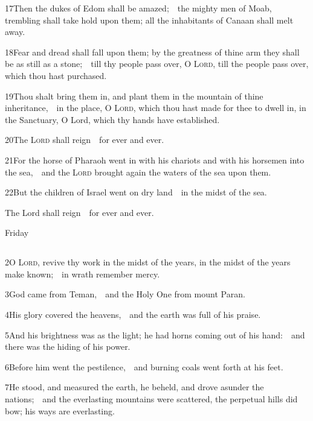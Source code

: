 17\enspace Then the dukes of Edom shall be amazed;\ \star\ the mighty men of Moab, trembling shall take hold upon them; all the inhabitants of Canaan shall melt away.

18\enspace Fear and dread shall fall upon them; by the greatness of thine arm they shall be as still as a stone;\ \star\ till thy people pass over, O {\scshape Lord}, till the people pass over, which thou hast purchased.

19\enspace Thou shalt bring them in, and plant them in the mountain of thine inheritance,\ \star\ in the place, O {\scshape Lord}, which thou hast made for thee to dwell in, in the Sanctuary, O Lord, which thy hands have established.

20\enspace The {\scshape Lord} shall reign\ \star\ for ever and ever.

21\enspace For the horse of Pharaoh went in with his chariots and with his horsemen into the sea,\ \star\ and the {\scshape Lord} brought again the waters of the sea upon them.

22\enspace But the children of Israel went on dry land\ \star\ in the midst of the sea.

 The Lord shall reign\ \star\ for ever and ever.

\medskip
\centerline{Friday}
\subsection{}

2\enspace O {\scshape Lord}, revive thy work in the midst of the years, in the midst of the years make known;\ \star\ in wrath remember mercy.

3\enspace God came from Teman,\ \star\ and the Holy One from mount Paran.

4\enspace His glory covered the heavens,\ \star\ and the earth was full of his praise.

5\enspace And his brightness was as the light; he had horns coming out of his hand:\ \star\ and there was the hiding of his power.

6\enspace Before him went the pestilence,\ \star\ and burning coals went forth at his feet.

7\enspace He stood, and measured the earth, he beheld, and drove asunder the nations;\ \star\ and the everlasting mountains were scattered, the perpetual hills did bow; his ways are everlasting.

